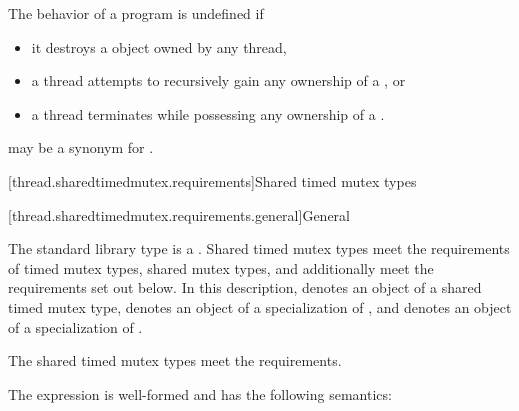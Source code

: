 \pnum
The behavior of a program is undefined if
\begin{itemize}
\item it destroys a  object owned by any thread,
\item a thread attempts to recursively gain any ownership of a , or
\item a thread terminates while possessing any ownership of a .
\end{itemize}

\pnum
{} may be a synonym for .

[thread.sharedtimedmutex.requirements]{Shared timed mutex types}

[thread.sharedtimedmutex.requirements.general]{General}

\pnum
The standard library type  is a
. Shared timed mutex types meet the requirements of
timed mutex types,
shared mutex types, and additionally
meet the requirements set out below. In this description,
 denotes an object of a shared timed mutex type,
 denotes an object of a specialization of
, and
 denotes an object of a specialization of
.
\begin{note}
The shared timed mutex types meet the 
requirements.
\end{note}

\pnum
The expression  is well-formed and
has the following semantics:

